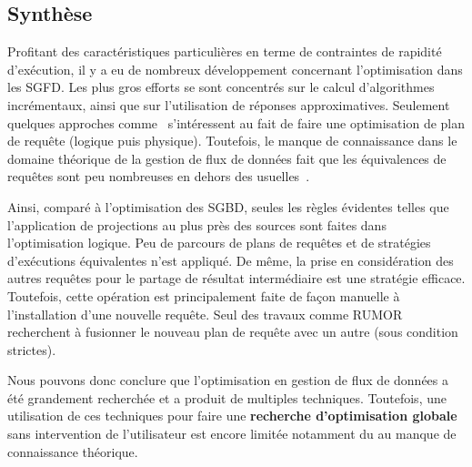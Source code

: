 \subsection{Synthèse}
Profitant des caractéristiques particulières en terme de contraintes de rapidité d'exécution, il y a eu de nombreux développement concernant l'optimisation dans les SGFD. Les plus gros efforts se sont concentrés sur le calcul d'algorithmes incrémentaux, ainsi que sur l'utilisation de réponses approximatives. Seulement quelques approches comme~\cite{Galpin:snee,Kramer:semantics} s'intéressent au fait de faire une optimisation de plan de requête (logique puis physique). Toutefois, le manque de connaissance dans le domaine théorique de la gestion de flux de données fait que les équivalences de requêtes sont peu nombreuses en dehors des usuelles~\cite{Slivinskas:temporal,Arasu:stream}.

Ainsi, comparé à l'optimisation des SGBD, seules les règles évidentes telles que l'application de projections au plus près des sources sont faites dans l'optimisation logique. Peu de parcours de plans de requêtes et de stratégies d'exécutions équivalentes n'est appliqué. De même, la prise en considération des autres requêtes pour le partage de résultat intermédiaire est une stratégie efficace. Toutefois, cette opération est principalement faite de façon manuelle à l'installation d'une nouvelle requête. Seul des travaux comme RUMOR~\cite{Hong:mqo} recherchent à fusionner le nouveau plan de requête avec un autre (sous condition strictes).

Nous pouvons donc conclure que l'optimisation en gestion de flux de données a été grandement recherchée et a produit de multiples techniques. Toutefois, une utilisation de ces techniques pour faire une \textbf{recherche d'optimisation globale} sans intervention de l'utilisateur est encore limitée notamment du au manque de connaissance théorique.



